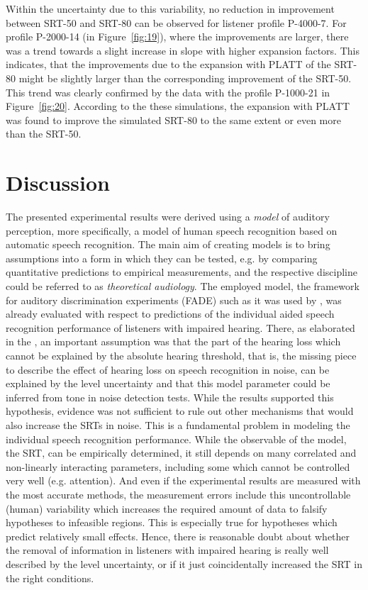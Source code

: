 \documentclass[10pt,a4paper,twocolumn]{article}
\begin{document}
%
Within the uncertainty due to this variability, no reduction in improvement between SRT-50 and SRT-80 can be observed for listener profile P-4000-7.
%
For profile P-2000-14 (in Figure~\ref{fig:19}), where the improvements are larger, there was a trend towards a slight increase in slope with higher expansion factors.
%
This indicates, that the improvements due to the expansion with PLATT of the SRT-80 might be slightly larger than the corresponding improvement of the SRT-50.
%
This trend was clearly confirmed by the data with the profile P-1000-21 in Figure~\ref{fig:20}.
%
According to the these simulations, the expansion with PLATT was found to improve the simulated SRT-80 to the same extent or even more than the SRT-50.

\section*{Discussion}
\label{sec:discussion}
%
The presented experimental results were derived using a \emph{model} of auditory perception, more specifically, a model of human speech recognition based on automatic speech recognition.
%
The main aim of creating models is to bring assumptions into a form in which they can be tested, e.g. by comparing quantitative predictions to empirical measurements, and the respective discipline could be referred to as \emph{theoretical audiology}.
%
The employed model, the framework for auditory discrimination experiments (FADE) such as it was used by \cite{schaedler2020a}, was already evaluated with respect to predictions of the individual aided speech recognition performance of listeners with impaired hearing.
%
There, as elaborated in the , an important assumption was that the part of the hearing loss which cannot be explained by the absolute hearing threshold, that is, the missing piece to describe the effect of hearing loss on speech recognition in noise, can be explained by the level uncertainty and that this model parameter could be inferred from tone in noise detection tests.
%
While the results supported this hypothesis, evidence was not sufficient to rule out other mechanisms that would also increase the SRTs in noise.
%
This is a fundamental problem in modeling the individual speech recognition performance.
%
While the observable of the model, the SRT, can be empirically determined, it still depends on many correlated and non-linearly interacting parameters, including some which cannot be controlled very well (e.g. attention).
%
And even if the experimental results are measured with the most accurate methods, the measurement errors include this uncontrollable (human) variability which increases the required amount of data to falsify hypotheses to infeasible regions.
%
This is especially true for hypotheses which predict relatively small effects.
%
Hence, there is reasonable doubt about whether the removal of information in listeners with impaired hearing is really well described by the level uncertainty, or if it just coincidentally increased the SRT in the right conditions.
\end{document}
